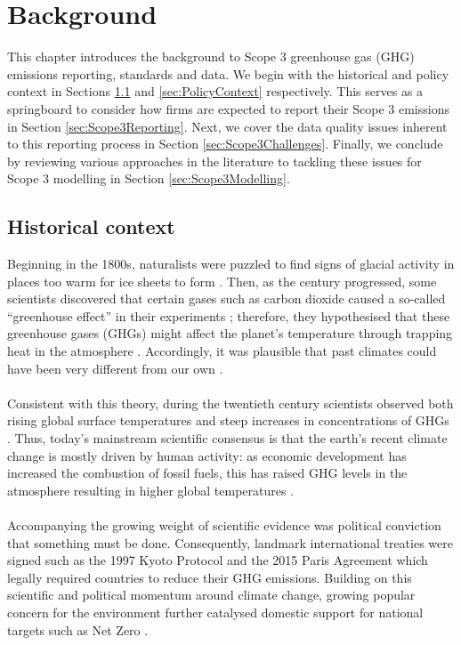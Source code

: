 \documentclass[12pt,twoside]{report}
\begin{document}
\chapter{Background}

This chapter introduces the background to Scope 3 greenhouse gas (GHG) emissions reporting, standards and data. We begin with the historical and policy context in Sections \ref{sec:HistoricalContext} and \ref{sec:PolicyContext} respectively. This serves as a springboard to consider how firms are expected to report their Scope 3 emissions in Section \ref{sec:Scope3Reporting}. Next, we cover the data quality issues inherent to this reporting process in Section \ref{sec:Scope3Challenges}. Finally, we conclude by reviewing various approaches in the literature to tackling these issues for Scope 3 modelling in Section \ref{sec:Scope3Modelling}. 

\section{Historical context}\label{sec:HistoricalContext}
Beginning in the 1800s, naturalists were puzzled to find signs of glacial activity in places too warm for ice sheets to form \cite{young1995}. Then, as the century progressed, some scientists discovered that certain gases such as carbon dioxide caused a so-called ``greenhouse effect'' in their experiments \cite{Ekholm1901}; therefore, they hypothesised that these greenhouse gases (GHGs) might affect the planet's temperature through trapping heat in the atmosphere \cite{Arrhenius1896}. Accordingly, it was plausible that past climates could have been very different from our own \cite{foote1856}. 
\\\\
Consistent with this theory, during the twentieth century scientists observed both rising global surface temperatures and steep increases in concentrations of GHGs \cite{Sawyer1972}. Thus, today's mainstream scientific consensus is that the earth's recent climate change is mostly driven by human activity: as economic development has increased the combustion of fossil fuels, this has raised GHG levels in the atmosphere resulting in higher global temperatures \cite{IPCC2021, RS2020}. 
\\\\
Accompanying the growing weight of scientific evidence was political conviction that something must be done. Consequently, landmark international treaties were signed such as the 1997 Kyoto Protocol \cite{UN1997} and the 2015 Paris Agreement \cite{UNFCCC2020} which legally required countries to reduce their GHG emissions. Building on this scientific and political momentum around climate change, growing popular concern for the environment further catalysed domestic support for national targets such as Net Zero \cite{Poortinga2023}. 
\end{document}
